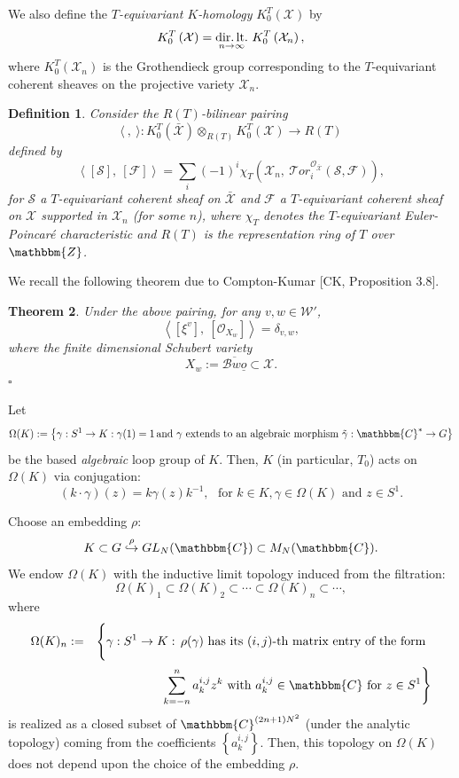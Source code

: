 \documentclass{article}
\newtheorem{theorem}{Theorem}[section]
\newtheorem{definition}[theorem]{Definition}
\def\X{\mathcal{X}}
\def\B{\mathcal{B}}
\def\W{\mathcal{W}}
\def\mathbb{\mathbbm}
\def\cite#1{#1}
\def\Tor{\rm{Tor}}
\def\dir.lt.{\rm{dir.\, lt.}}
\def\Tor{\mathcal{T}or}
\begin{document}
We also define the {\it $T$-equivariant $K$-homology} $K^T_0 \left( {\X}\right)$ by 
$$
K^T_0 \left( {\X}\right) = \underset{n\rightarrow \infty}{\dir.lt.}\,\, K^T_0 \left( {\X}_n\right), 
$$
where $K^T_0 \left( {\X}_n\right)$ is the Grothendieck group corresponding to the $T$-equivariant coherent sheaves on the projective variety $\X_n$.

\begin{definition}\label{2.3}\rm{
Consider the $R(T)$-bilinear pairing 
$$\langle ~,~ \rangle: K^T_0 \left( \bar{\X}\right) \otimes_{R(T)} K^T_0 \left( {\X}\right) \rightarrow R(T)$$
 defined by 
$$
\left\langle \left[\mathcal{S}\right],~\left[\mathcal{F}\right] \right\rangle = \sum_{i} (-1)^i  \chi_T \left( \X_n,~ \Tor_i^{\mathcal{O}_{\bar{\X}}} \left(\mathcal{S},\mathcal{F}\right)\right), 
$$ 
for $\mathcal{S}$ a $T$-equivariant coherent sheaf on $\bar{\X}$ and $\mathcal{F}$  a $T$-equivariant coherent sheaf on $\X$ supported in $\X_n$ (for some $n$), where $\chi_T$ denotes the $T$-equivariant Euler-Poincar\'e characteristic and $R(T)$ is the representation ring of $T$ over $\mathbb{Z}$.  }
\end{definition}

We recall the following theorem due to Compton-Kumar [\cite{CK}, Proposition 3.8].

 \begin{theorem}\label{2.4} 
 Under the above pairing, for any $v,  w\in \W'$, 
$$
\left\langle \left[ \xi^v\right], ~\left[ \mathcal{O}_{X_w}\right]\right\rangle = \delta _{v,w},
$$
where the finite dimensional Schubert variety 
$$
X_w := \overline{\B w \underline{o}} \subset \X.
$$
$\square$
\end{theorem}

Let $$\Omega (K) :=\left\{\gamma: S^1 \rightarrow K: \gamma (1) =1\,\text{and $\gamma$  extends to an algebraic morphism $\tilde{\gamma}: \mathbb{C}^* \rightarrow G$}\right\}$$
be the based {\it algebraic}  loop group of $K$. 
Then, $K$ (in particular, $T_0$) acts on $\Omega (K)$ via conjugation: 
$$\left(k\cdot \gamma\right) (z)= k\gamma (z)k^{-1},\,\,\text{ for $k\in K,  \gamma\in \Omega (K)$ and $z\in S^1$}.$$

Choose an embedding $\rho$:
$$
K\subset G \overset{\rho} {\hookrightarrow}
GL_N(\mathbbm{C}) \subset M_N(\mathbbm{C}).
$$
We endow $\Omega (K)$ with the 
   inductive limit topology induced from the filtration: 
$$
\Omega (K)_1 \subset \Omega(K)_2 \subset \cdots \subset \Omega (K)_n \subset \cdots ,
$$
where
\begin{eqnarray*}
\Omega (K)_n &:=& \left\{\vphantom{\sum_{k=-n}^n a_k^{i,j}} \gamma:S^1 \rightarrow K:\, \rho(\gamma)\mbox{ has its $(i,j)$-th matrix entry of the form } \right.\\
&&\left.\sum_{k=-n}^n a_k^{i,j}
 z^k\mbox{ with } a_k^{i,j}  \in \mathbb{C} \mbox{ for } z \in S^1\right\}
\end{eqnarray*}
is realized as a closed subset of $\mathbbm{C}^{(2n+1)N^2}$ (under the analytic topology) coming from the coefficients $\left\{ a_k^{i,j}\right\}$. Then, this topology on $\Omega (K) $ does not depend upon the choice of the embedding $\rho$. 
\end{document}
